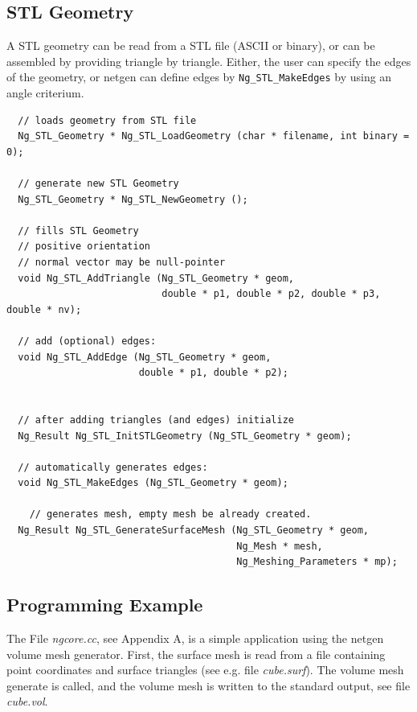 \documentclass[12pt]{book}
\begin{document}
\subsection{STL Geometry}
A STL geometry can be read from a STL file (ASCII or binary), or can
be assembled by providing triangle by triangle. Either, the user
can specify the edges of the geometry, or netgen can define edges 
by {\tt Ng\_STL\_MakeEdges} by using an angle criterium.

\begin{verbatim}
  // loads geometry from STL file
  Ng_STL_Geometry * Ng_STL_LoadGeometry (char * filename, int binary = 0);

  // generate new STL Geometry
  Ng_STL_Geometry * Ng_STL_NewGeometry ();
  
  // fills STL Geometry
  // positive orientation
  // normal vector may be null-pointer
  void Ng_STL_AddTriangle (Ng_STL_Geometry * geom, 
                           double * p1, double * p2, double * p3, double * nv);

  // add (optional) edges:
  void Ng_STL_AddEdge (Ng_STL_Geometry * geom, 
                       double * p1, double * p2);


  // after adding triangles (and edges) initialize
  Ng_Result Ng_STL_InitSTLGeometry (Ng_STL_Geometry * geom);

  // automatically generates edges:
  void Ng_STL_MakeEdges (Ng_STL_Geometry * geom);

    // generates mesh, empty mesh be already created.
  Ng_Result Ng_STL_GenerateSurfaceMesh (Ng_STL_Geometry * geom,
                                        Ng_Mesh * mesh,
                                        Ng_Meshing_Parameters * mp);
\end{verbatim}

\subsection{Programming Example}

The File {\it ngcore.cc}, see Appendix A, is a simple application
using the netgen volume mesh generator. First, the surface mesh
is read from a file containing point coordinates and surface triangles
(see e.g. file {\it cube.surf}). The volume mesh generate is called, 
and the volume mesh is written to the standard output, see file {\it cube.vol}.
\end{document}

